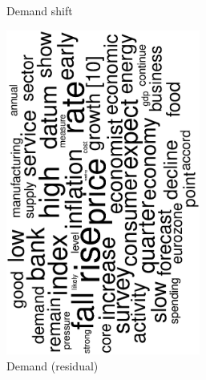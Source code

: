 \begin{figure}
\begin{subfigure}{0.32\textwidth}
		\caption{Demand shift}
	\end{subfigure}
	\begin{subfigure}{0.32\textwidth}
		\includegraphics[width=0.7\textwidth,angle=270]{figures/wordcloud8.eps}
		\caption{Demand (residual)}
	\end{subfigure}
	\begin{subfigure}{0.32\textwidth}

\end{subfigure}
\end{figure}
